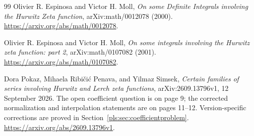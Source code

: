 \documentclass[11pt,letterpaper]{article}
\numberwithin{equation}{section}
\theoremstyle{definition}
\theoremstyle{remark}\newtheorem{remark}[theorem]{Remark}
\begin{document}
\begin{thebibliography}{99}
Olivier R. Espinosa and Victor H. Moll,
\emph{On some Definite Integrals involving the Hurwitz Zeta function},
arXiv:math/0012078 (2000).
\url{https://arxiv.org/abs/math/0012078}.

Olivier R. Espinosa and Victor H. Moll,
\emph{On some integrals involving the Hurwitz zeta function: part 2},
arXiv:math/0107082 (2001).
\url{https://arxiv.org/abs/math/0107082}.

Dora Pokaz, Mihaela Ribi\v ci\'c Penava, and Yilmaz Simsek,
\emph{Certain families of series involving Hurwitz and Lerch zeta functions},
arXiv:2609.13796v1, 12 September 2026.
The open coefficient question is on page 9; the corrected normalization
and interpolation statements are on pages 11--12. Version-specific
corrections are proved in Section~\ref{pls:sec:coefficientproblem}.
\url{https://arxiv.org/abs/2609.13796v1}.
\end{thebibliography}
\end{document}
